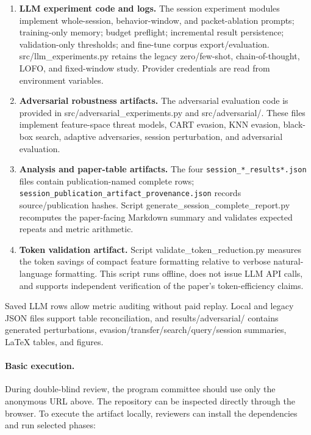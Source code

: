 \documentclass[letterpaper,twocolumn,10pt]{article}
\begin{document}
\begin{enumerate}
    \item \textbf{LLM experiment code and logs.}
    The session experiment modules implement whole-session, behavior-window, and packet-ablation prompts; training-only memory; budget preflight; incremental result persistence; validation-only thresholds; and fine-tune corpus export/evaluation. src/llm\_experiments.py retains the legacy zero/few-shot, chain-of-thought, LOFO, and fixed-window study. Provider credentials are read from environment variables.

    \item \textbf{Adversarial robustness artifacts.}
    The adversarial evaluation code is provided in src/adversarial\_experiments.py and src/adversarial/. These files implement feature-space threat models, CART evasion, KNN evasion, black-box search, adaptive adversaries, session perturbation, and adversarial evaluation.  

    \item \textbf{Analysis and paper-table artifacts.}
    The four \texttt{session\_*\_results*.json} files contain publication-named complete rows; \texttt{session\_publication\_artifact\_provenance.json} records source/publication hashes. Script generate\_session\_complete\_report.py recomputes the paper-facing Markdown summary and validates expected repeats and metric arithmetic.

    \item \textbf{Token validation artifact.}
    Script validate\_token\_reduction.py measures the token savings of compact feature formatting relative to verbose natural-language formatting. This script runs offline, does not issue LLM API calls, and supports independent verification of the paper's token-efficiency claims.
\end{enumerate}

Saved LLM rows allow metric auditing without paid replay. Local and legacy JSON files support table reconciliation, and results/adversarial/ contains generated perturbations, evasion/transfer/search/query/session summaries, LaTeX tables, and figures.

\paragraph{Basic execution.}
During double-blind review, the program committee should use only the anonymous URL above. The repository can be inspected directly through the browser. To execute the artifact locally, reviewers can install the dependencies and run selected phases:
\end{document}

